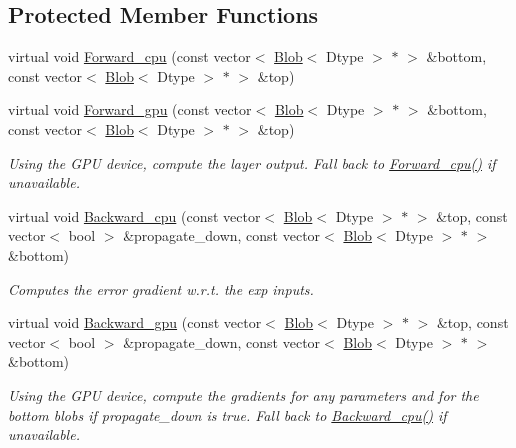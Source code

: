 \subsection*{Protected Member Functions}
\begin{DoxyCompactItemize}
\item 
virtual void \hyperlink{classcaffe_1_1LogLayer_a928ac703824992b46eb33210e049fdb6}{Forward\+\_\+cpu} (const vector$<$ \hyperlink{classcaffe_1_1Blob}{Blob}$<$ Dtype $>$ $\ast$ $>$ \&bottom, const vector$<$ \hyperlink{classcaffe_1_1Blob}{Blob}$<$ Dtype $>$ $\ast$ $>$ \&top)
\item 
virtual void \hyperlink{classcaffe_1_1LogLayer_a6f9540e08387ce74287a6ee7abca8b1c}{Forward\+\_\+gpu} (const vector$<$ \hyperlink{classcaffe_1_1Blob}{Blob}$<$ Dtype $>$ $\ast$ $>$ \&bottom, const vector$<$ \hyperlink{classcaffe_1_1Blob}{Blob}$<$ Dtype $>$ $\ast$ $>$ \&top)\hypertarget{classcaffe_1_1LogLayer_a6f9540e08387ce74287a6ee7abca8b1c}{}\label{classcaffe_1_1LogLayer_a6f9540e08387ce74287a6ee7abca8b1c}

\begin{DoxyCompactList}\small\item\em Using the G\+PU device, compute the layer output. Fall back to \hyperlink{classcaffe_1_1LogLayer_a928ac703824992b46eb33210e049fdb6}{Forward\+\_\+cpu()} if unavailable. \end{DoxyCompactList}\item 
virtual void \hyperlink{classcaffe_1_1LogLayer_adde7e59f9b065e518e6f254c408eb3ef}{Backward\+\_\+cpu} (const vector$<$ \hyperlink{classcaffe_1_1Blob}{Blob}$<$ Dtype $>$ $\ast$ $>$ \&top, const vector$<$ bool $>$ \&propagate\+\_\+down, const vector$<$ \hyperlink{classcaffe_1_1Blob}{Blob}$<$ Dtype $>$ $\ast$ $>$ \&bottom)
\begin{DoxyCompactList}\small\item\em Computes the error gradient w.\+r.\+t. the exp inputs. \end{DoxyCompactList}\item 
virtual void \hyperlink{classcaffe_1_1LogLayer_ac4399854936b71196392d7736c162081}{Backward\+\_\+gpu} (const vector$<$ \hyperlink{classcaffe_1_1Blob}{Blob}$<$ Dtype $>$ $\ast$ $>$ \&top, const vector$<$ bool $>$ \&propagate\+\_\+down, const vector$<$ \hyperlink{classcaffe_1_1Blob}{Blob}$<$ Dtype $>$ $\ast$ $>$ \&bottom)\hypertarget{classcaffe_1_1LogLayer_ac4399854936b71196392d7736c162081}{}\label{classcaffe_1_1LogLayer_ac4399854936b71196392d7736c162081}

\begin{DoxyCompactList}\small\item\em Using the G\+PU device, compute the gradients for any parameters and for the bottom blobs if propagate\+\_\+down is true. Fall back to \hyperlink{classcaffe_1_1LogLayer_adde7e59f9b065e518e6f254c408eb3ef}{Backward\+\_\+cpu()} if unavailable. \end{DoxyCompactList}\end{DoxyCompactItemize}
